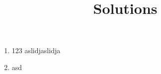 \documentclass{article}
\begin{document}


\title{Solutions}
\begin{enumerate}
        \item 123
aslidjaslidja
        \item asd

\end{enumerate}
\end{document}
